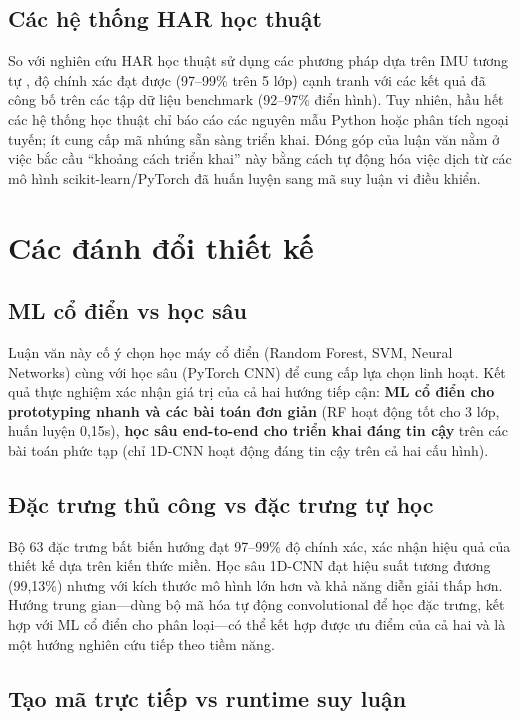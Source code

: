 \subsection{Các hệ thống HAR học thuật}
So với nghiên cứu HAR học thuật sử dụng các phương pháp dựa trên IMU tương tự \cite{anguita2013har}, độ chính xác đạt được (97--99\% trên 5 lớp) cạnh tranh với các kết quả đã công bố trên các tập dữ liệu benchmark (92--97\% điển hình). Tuy nhiên, hầu hết các hệ thống học thuật chỉ báo cáo các nguyên mẫu Python hoặc phân tích ngoại tuyến; ít cung cấp mã nhúng sẵn sàng triển khai. Đóng góp của luận văn nằm ở việc bắc cầu ``khoảng cách triển khai'' này bằng cách tự động hóa việc dịch từ các mô hình scikit-learn/PyTorch đã huấn luyện sang mã suy luận vi điều khiển.

\section{Các đánh đổi thiết kế}

\subsection{ML cổ điển vs học sâu}
Luận văn này cố ý chọn học máy cổ điển (Random Forest, SVM, Neural Networks) cùng với học sâu (PyTorch CNN) để cung cấp lựa chọn linh hoạt. Kết quả thực nghiệm xác nhận giá trị của cả hai hướng tiếp cận: \textbf{ML cổ điển cho prototyping nhanh và các bài toán đơn giản} (RF hoạt động tốt cho 3 lớp, huấn luyện 0,15s), \textbf{học sâu end-to-end cho triển khai đáng tin cậy} trên các bài toán phức tạp (chỉ 1D-CNN hoạt động đáng tin cậy trên cả hai cấu hình).

\subsection{Đặc trưng thủ công vs đặc trưng tự học}
Bộ 63 đặc trưng bất biến hướng đạt 97--99\% độ chính xác, xác nhận hiệu quả của thiết kế dựa trên kiến thức miền. Học sâu 1D-CNN đạt hiệu suất tương đương (99,13\%) nhưng với kích thước mô hình lớn hơn và khả năng diễn giải thấp hơn. Hướng trung gian---dùng bộ mã hóa tự động convolutional để học đặc trưng, kết hợp với ML cổ điển cho phân loại---có thể kết hợp được ưu điểm của cả hai và là một hướng nghiên cứu tiếp theo tiềm năng.

\subsection{Tạo mã trực tiếp vs runtime suy luận}
\label{sec:codegen_tradeoff_discussion}

